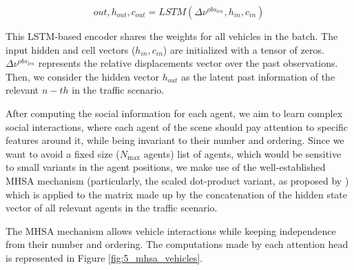 \begin{equation}
	out, h_{out}, c_{out} = LSTM(\Delta \nu^{obs_{len}}, h_{in}, c_{in})
\end{equation}

This \ac{LSTM}-based encoder shares the weights for all vehicles in the batch. The input hidden and cell vectors ($h_{in}, c_{in}$) are initialized with a tensor of zeros. $\Delta \nu^{obs_{len}}$ represents the relative displacements vector over the past observations. Then, we consider the hidden vector $h_{out}$ as the latent past information of the relevant $n-th$ in the traffic scenario.

After computing the social information for each agent, we aim to learn complex social interactions, where each agent of the scene should pay attention to specific features around it, while being invariant to their number and ordering. Since we want to avoid a fixed size ($N_{\text{max}}$ agents) list of agents, which would be sensitive to small variants in the agent positions, we make use of the well-established \acf{MHSA} mechanism \cite{vaswani2017attention} (particularly, the scaled dot-product variant, as proposed by \cite{mercat2020multi}) which is applied to the matrix made up by the concatenation of the hidden state vector of all relevant agents in the traffic scenario.

The \ac{MHSA} mechanism allows vehicle interactions while keeping independence from their number
and ordering. The computations made by each attention head is represented in Figure \ref{fig:5_mhsa_vehicles}.

